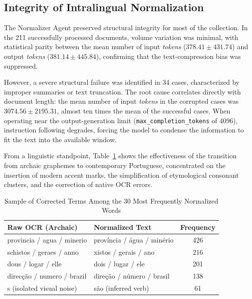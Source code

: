 \documentclass[conference]{IEEEtran}
\begin{document}
\subsection{Integrity of Intralingual Normalization}

The Normalizer Agent preserved structural integrity for most of the collection. In the 211 successfully processed documents, volume variation was minimal, with statistical parity between the mean number of input \textit{tokens} ($378.41 \pm 431.74$) and output \textit{tokens} ($381.14 \pm 445.84$), confirming that the text-compression bias was suppressed.

However, a severe structural failure was identified in 34 cases, characterized by improper summaries or text truncation. The root cause correlates directly with document length: the mean number of input \textit{tokens} in the corrupted cases was $3074.56 \pm 2195.31$, almost ten times the mean of the successful cases. When operating near the output-generation limit (\texttt{max\_completion\_tokens} of 4096), instruction following degrades, forcing the model to condense the information to fit the text into the available window.

From a linguistic standpoint, Table~\ref{tab:palavras_alteradas} shows the effectiveness of the transition from archaic graphemes to contemporary Portuguese, concentrated on the insertion of modern accent marks, the simplification of etymological consonant clusters, and the correction of native OCR errors.

\begin{table}[htbp]
\caption{Sample of Corrected Terms Among the 30 Most Frequently Normalized Words}
\label{tab:palavras_alteradas}
\centering
\footnotesize
\begin{tabular}{|l|l|c|}
\hline
\textbf{Raw OCR (Archaic)} & \textbf{Normalized Text} & \textbf{Frequency} \\
\hline
provincia / agua / minerio & província / água / minério & 426 \\
schistos / geraes / anno & xistos / gerais / ano & 216 \\
dous / logar / elle & dois / lugar / ele & 201 \\
direcção / numero / brazil & direção / número / brasil & 138 \\
s (isolated visual noise) & são (inferred verb) & 61 \\
\hline
\end{tabular}
\end{table}
\end{document}
